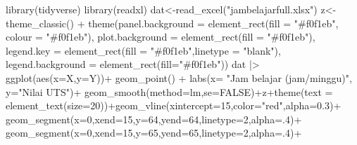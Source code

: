 \documentclass[
  letterpaper,
  DIV=11,
  numbers=noendperiod]{scrartcl}
\newenvironment{Shaded}{\begin{snugshade}}{\end{snugshade}}
\newcommand{\AttributeTok}[1]{\textcolor[rgb]{0.40,0.45,0.13}{#1}}
\newcommand{\ConstantTok}[1]{\textcolor[rgb]{0.56,0.35,0.01}{#1}}
\newcommand{\DecValTok}[1]{\textcolor[rgb]{0.68,0.00,0.00}{#1}}
\newcommand{\FloatTok}[1]{\textcolor[rgb]{0.68,0.00,0.00}{#1}}
\newcommand{\FunctionTok}[1]{\textcolor[rgb]{0.28,0.35,0.67}{#1}}
\newcommand{\NormalTok}[1]{\textcolor[rgb]{0.00,0.23,0.31}{#1}}
\newcommand{\OtherTok}[1]{\textcolor[rgb]{0.00,0.23,0.31}{#1}}
\newcommand{\SpecialCharTok}[1]{\textcolor[rgb]{0.37,0.37,0.37}{#1}}
\newcommand{\StringTok}[1]{\textcolor[rgb]{0.13,0.47,0.30}{#1}}
\begin{document}
\begin{Shaded}
\begin{Highlighting}[]
\FunctionTok{library}\NormalTok{(tidyverse)}
\FunctionTok{library}\NormalTok{(readxl)}
\NormalTok{dat}\OtherTok{\textless{}{-}}\FunctionTok{read\_excel}\NormalTok{(}\StringTok{"jambelajarfull.xlsx"}\NormalTok{)}
\NormalTok{z}\OtherTok{\textless{}{-}}\FunctionTok{theme\_classic}\NormalTok{() }\SpecialCharTok{+}
  \FunctionTok{theme}\NormalTok{(}\AttributeTok{panel.background =} \FunctionTok{element\_rect}\NormalTok{(}\AttributeTok{fill =} \StringTok{"\#f0f1eb"}\NormalTok{,}
                                        \AttributeTok{colour =} \StringTok{"\#f0f1eb"}\NormalTok{),}
        \AttributeTok{plot.background =} \FunctionTok{element\_rect}\NormalTok{(}\AttributeTok{fill =} \StringTok{"\#f0f1eb"}\NormalTok{),}
        \AttributeTok{legend.key =} \FunctionTok{element\_rect}\NormalTok{(}\AttributeTok{fill =} \StringTok{"\#f0f1eb"}\NormalTok{,}\AttributeTok{linetype =} \StringTok{"blank"}\NormalTok{),}
        \AttributeTok{legend.background =} \FunctionTok{element\_rect}\NormalTok{(}\AttributeTok{fill=}\StringTok{"\#f0f1eb"}\NormalTok{))}
\NormalTok{dat }\SpecialCharTok{|\textgreater{}} \FunctionTok{ggplot}\NormalTok{(}\FunctionTok{aes}\NormalTok{(}\AttributeTok{x=}\NormalTok{X,}\AttributeTok{y=}\NormalTok{Y))}\SpecialCharTok{+}
  \FunctionTok{geom\_point}\NormalTok{() }\SpecialCharTok{+}
  \FunctionTok{labs}\NormalTok{(}\AttributeTok{x=} \StringTok{"Jam belajar (jam/minggu)"}\NormalTok{, }\AttributeTok{y=}\StringTok{"Nilai UTS"}\NormalTok{)}\SpecialCharTok{+}
  \FunctionTok{geom\_smooth}\NormalTok{(}\AttributeTok{method=}\NormalTok{lm,}\AttributeTok{se=}\ConstantTok{FALSE}\NormalTok{)}\SpecialCharTok{+}\NormalTok{z}\SpecialCharTok{+}\FunctionTok{theme}\NormalTok{(}\AttributeTok{text =} \FunctionTok{element\_text}\NormalTok{(}\AttributeTok{size=}\DecValTok{20}\NormalTok{))}\SpecialCharTok{+}\FunctionTok{geom\_vline}\NormalTok{(}\AttributeTok{xintercept=}\DecValTok{15}\NormalTok{,}\AttributeTok{color=}\StringTok{"red"}\NormalTok{,}\AttributeTok{alpha=}\FloatTok{0.3}\NormalTok{)}\SpecialCharTok{+}
  \FunctionTok{geom\_segment}\NormalTok{(}\AttributeTok{x=}\DecValTok{0}\NormalTok{,}\AttributeTok{xend=}\DecValTok{15}\NormalTok{,}\AttributeTok{y=}\DecValTok{64}\NormalTok{,}\AttributeTok{yend=}\DecValTok{64}\NormalTok{,}\AttributeTok{linetype=}\DecValTok{2}\NormalTok{,}\AttributeTok{alpha=}\NormalTok{.}\DecValTok{4}\NormalTok{)}\SpecialCharTok{+}
  \FunctionTok{geom\_segment}\NormalTok{(}\AttributeTok{x=}\DecValTok{0}\NormalTok{,}\AttributeTok{xend=}\DecValTok{15}\NormalTok{,}\AttributeTok{y=}\DecValTok{65}\NormalTok{,}\AttributeTok{yend=}\DecValTok{65}\NormalTok{,}\AttributeTok{linetype=}\DecValTok{2}\NormalTok{,}\AttributeTok{alpha=}\NormalTok{.}\DecValTok{4}\NormalTok{)}\SpecialCharTok{+}

\end{Highlighting}
\end{Shaded}
\end{document}

